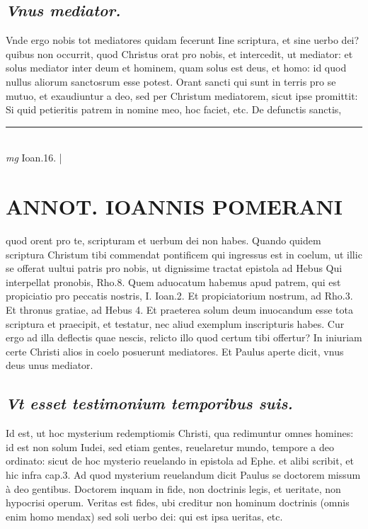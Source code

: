 \documentclass{article}
\begin{document}
\begin{pages}
\subsection*{\textit{Vnus mediator. }}\pstart Vnde ergo nobis tot mediatores quidam fecerunt Iine scriptura, et sine uerbo dei? quibus non occurrit, quod Christus orat pro nobis, et intercedit, ut mediator: et solus mediator inter deum et hominem, quam solus est deus, et homo: id quod nullus aliorum sanctosrum esse potest. Orant sancti qui sunt in terris pro se mutuo, et exaudiuntur a deo, sed per Christum mediatorem, sicut ipse promittit: Si quid petieritis patrem in nomine meo, hoc faciet, etc. De defunctis sanctis,  \pend
\vspace{0.5cm}\noindent
\vspace{0.2cm}\rule{1cm}{0.2pt}\\ 
\hspace{0.2cm}\textit{mg}
\footnotesize Ioan.16. 
\normalsize| 
\section*{ANNOT. IOANNIS POMERANI }\pstart quod orent pro te, scripturam et uerbum dei non habes. Quando quidem scriptura Christum tibi commendat pontificem qui ingressus est in coelum, ut illic se offerat uultui patris pro nobis, ut dignissime tractat epistola ad Hebus  Qui interpellat pronobis, Rho.8. Quem aduocatum habemus apud patrem, qui est propiciatio pro peccatis nostris, I. Ioan.2. Et propiciatorium nostrum, ad Rho.3. Et thronus gratiae, ad Hebus 4. Et praeterea solum deum inuocandum esse tota scriptura et praecipit, et testatur, nec aliud exemplum inscripturis habes. Cur ergo ad illa deflectis quae nescis, relicto illo quod certum tibi offertur? In iniuriam certe Christi alios in coelo posuerunt mediatores. Et Paulus aperte dicit, vnus deus unus mediator.  \pend
{}
{}
\subsection*{\textit{Vt esset testimonium temporibus suis. }}\pstart Id est, ut hoc mysterium redemptiomis Christi, qua redimuntur omnes homines: id est non solum Iudei, sed etiam gentes, reuelaretur mundo, tempore a deo ordinato: sicut de hoc mysterio reuelando in epistola ad Ephe. et alibi scribit, et hic infra cap.3. Ad quod mysterium reuelandum dicit Paulus se doctorem missum à deo gentibus. Doctorem inquam in fide, non doctrinis legis, et ueritate, non hypocrisi operum. Veritas est fides, ubi creditur non hominum doctrinis (omnis enim homo mendax) sed soli uerbo dei: qui est ipsa ueritas, etc.  \pend
{}
{}

\end{pages}
\end{document}
